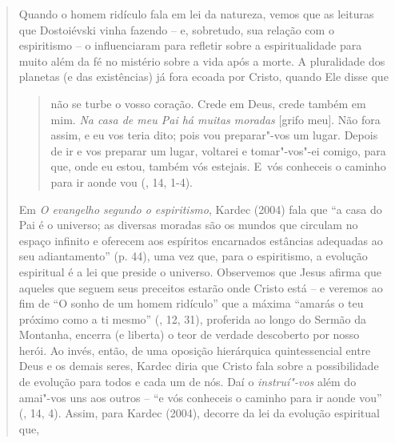 {\begin{quote}
Quando o homem ridículo fala em lei da natureza, vemos que as leituras
que Dostoiévski vinha fazendo -- e, sobretudo, sua relação com o
espiritismo -- o influenciaram para refletir sobre a espiritualidade
para muito além da fé no mistério sobre a vida após a morte. A
pluralidade dos planetas (e das existências) já fora ecoada por Cristo,
quando Ele disse que

\begin{quote}
não se turbe o vosso coração. Crede em Deus, crede também em mim.
\emph{Na casa de meu Pai há muitas moradas} {[}grifo meu{]}. Não fora
assim, e eu vos teria dito; pois vou preparar"-vos um lugar. Depois de ir
e vos preparar um lugar, voltarei e tomar"-vos"-ei comigo, para que, onde
eu estou, também vós estejais. E~vós conheceis o caminho para ir aonde
vou (, 14, 1-4).
\end{quote}

Em \emph{O evangelho segundo o espiritismo}, Kardec (2004) fala que ``a
casa do Pai é o universo; as diversas moradas são os mundos que circulam
no espaço infinito e oferecem aos espíritos encarnados estâncias
adequadas ao seu adiantamento'' (p. 44), uma vez que, para o
espiritismo, a evolução espiritual é a lei que preside o universo.
Observemos que Jesus afirma que aqueles que seguem seus preceitos
estarão onde Cristo está -- e veremos ao fim de ``O sonho de um homem
ridículo'' que a máxima ``amarás o teu próximo como a ti mesmo''
(, 12, 31), proferida ao longo do Sermão da Montanha, encerra (e
liberta) o teor de verdade descoberto por nosso herói. Ao invés, então,
de uma oposição hierárquica quintessencial entre Deus e os demais seres,
Kardec diria que Cristo fala sobre a possibilidade de evolução para
todos e cada um de nós. Daí o \emph{instruí"-vos} além do amai"-vos uns
aos outros -- ``e vós conheceis o caminho para ir aonde vou'' (, 14,
4). Assim, para Kardec (2004), decorre da lei da evolução espiritual
que,


\end{quote}}
